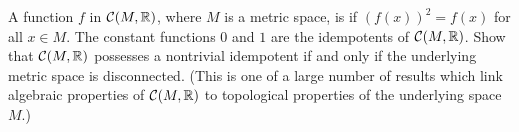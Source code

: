 \begin{prob} A function $f$ in $\mathcal{C}(M,\mathbb{R})$, where $M$ is a metric space, is
 if $(f(x))^2 = f(x)$ for all $x \in M$.  The constant functions $0$ and $1$
are the  idempotents of $\mathcal{C}(M,\mathbb{R})$.  Show that $\mathcal{C}(M,\mathbb{R})$ possesses a
nontrivial idempotent if and only if the underlying metric space is disconnected. (This is one
of a large number of results which link algebraic properties of $\mathcal{C}(M,\mathbb{R})$ to topological
properties of the underlying space~$M$.)
\end{prob}




\endinput
